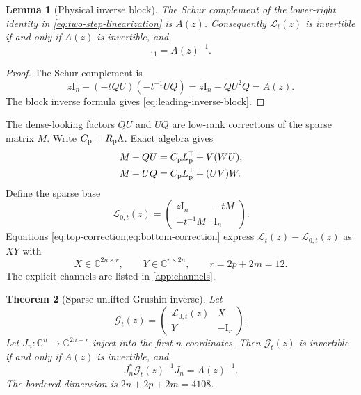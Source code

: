 \documentclass[11pt]{article}
\newtheorem{theorem}{Theorem}[section]
\newtheorem{lemma}[theorem]{Lemma}
\theoremstyle{definition}
\theoremstyle{remark}
\newcommand{\C}{\mathbb C}
\newcommand{\Id}{\mathrm I}
\newcommand{\Gmat}{\mathcal G}
\newcommand{\Lmat}{\mathcal L}
\begin{document}
\begin{lemma}[Physical inverse block]
\label{lem:physical-inverse}
The Schur complement of the lower-right identity in
\cref{eq:two-step-linearization} is $A(z)$.  Consequently
$\Lmat_t(z)$ is invertible if and only if $A(z)$ is invertible, and
\begin{equation}
 [\Lmat_t(z)^{-1}]_{11}=A(z)^{-1}.
 \label{eq:leading-inverse-block}
\end{equation}
\end{lemma}

\begin{proof}
The Schur complement is
\[
 z\Id_n-(-tQU)(-t^{-1}UQ)=z\Id_n-QU^2Q=A(z).
\]
The block inverse formula gives \cref{eq:leading-inverse-block}.
\end{proof}

The dense-looking factors $QU$ and $UQ$ are low-rank corrections of the
sparse matrix $M$.  Write $C_{\rm p}=R_{\rm p}\Lambda$.  Exact algebra gives
\begin{align}
 M-QU&=C_{\rm p}L_{\rm p}^{\mathsf T}+V(WU),
 \label{eq:top-correction}\\
 M-UQ&=C_{\rm p}L_{\rm p}^{\mathsf T}+(UV)W.
 \label{eq:bottom-correction}
\end{align}
Define the sparse base
\begin{equation}
 \Lmat_{0,t}(z)=
 \begin{pmatrix}
  z\Id_n&-tM\\
  -t^{-1}M&\Id_n
 \end{pmatrix}.
 \label{eq:sparse-base}
\end{equation}
Equations \cref{eq:top-correction,eq:bottom-correction} express
$\Lmat_t(z)-\Lmat_{0,t}(z)$ as $XY$ with
\begin{equation}
 X\in\C^{2n\times r},\qquad Y\in\C^{r\times2n},\qquad r=2p+2m=12.
 \label{eq:channel-rank}
\end{equation}
The explicit channels are listed in \cref{app:channels}.

\begin{theorem}[Sparse unlifted Grushin inverse]
\label{thm:sparse-grushin}
Let
\begin{equation}
 \Gmat_t(z)=
 \begin{pmatrix}
  \Lmat_{0,t}(z)&X\\
  Y&-\Id_r
 \end{pmatrix}.
 \label{eq:bordered-grushin}
\end{equation}
Let $J_n:\C^n\to\C^{2n+r}$ inject into the first $n$ coordinates.  Then
$\Gmat_t(z)$ is invertible if and only if $A(z)$ is invertible, and
\begin{equation}
 J_n^*\Gmat_t(z)^{-1}J_n=A(z)^{-1}.
 \label{eq:grushin-physical-block}
\end{equation}
The bordered dimension is $2n+2p+2m=4108$.
\end{theorem}
\end{document}
